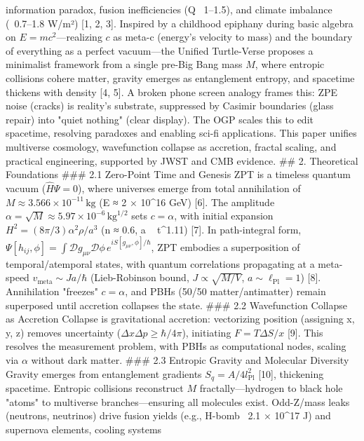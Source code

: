 information paradox, fusion inefficiencies (Q ~1–1.5), and climate imbalance (~0.7–1.8 W/m²) [1, 
2, 3]. Inspired by a childhood epiphany during basic algebra on \( E = mc^2 \)—realizing \( c \) 
as meta-c (energy’s velocity to mass) and the boundary of everything as a perfect vacuum—the 
Unified Turtle-Verse proposes a minimalist framework from a single pre-Big Bang mass \( M \), 
where entropic collisions cohere matter, gravity emerges as entanglement entropy, and 
spacetime thickens with density [4, 5]. A broken phone screen analogy frames this: ZPE noise 
(cracks) is reality’s substrate, suppressed by Casimir boundaries (glass repair) into "quiet 
nothing" (clear display). The OGP scales this to edit spacetime, resolving paradoxes and 
enabling sci-fi applications. This paper unifies multiverse cosmology, wavefunction collapse as 
accretion, fractal scaling, and practical engineering, supported by JWST and CMB evidence. 
## 2. Theoretical Foundations 
### 2.1 Zero-Point Time and Genesis 
ZPT is a timeless quantum vacuum (\( \hat{H} \Psi = 0 \)), where universes emerge from total 
annihilation of \( M \approx 3.566 \times 10^{-11} \, \text{kg} \) (E ≈ 2 × 10^{16} GeV) [6]. The 
amplitude \( \alpha = \sqrt{M} \approx 5.97 \times 10^{-6} \, \text{kg}^{1/2} \) sets \( c = \alpha \), 
with initial expansion \( H^2 = (8\pi/3) \alpha^2 \rho / a^3 \) (n ≈ 0.6, a ~ t^{1.11}) [7]. In 
path-integral form, \( \Psi [h_{ij}, \phi] = \int \mathcal{D} g_{\mu\nu} \mathcal{D} \phi \, e^{i 
S[g_{\mu\nu}, \phi]/\hbar} \), ZPT embodies a superposition of temporal/atemporal states, with 
quantum correlations propagating at a meta-speed \( v_{\text{meta}} \sim J a / \hbar \) 
(Lieb-Robinson bound, \( J \propto \sqrt{M / V} \), \( a \sim \ell_{\text{Pl}} = 1 \)) [8]. Annihilation 
"freezes" \( c = \alpha \), and PBHs (50/50 matter/antimatter) remain superposed until accretion 
collapses the state. 
### 2.2 Wavefunction Collapse as Accretion 
Collapse is gravitational accretion: vectorizing position (assigning x, y, z) removes uncertainty (\( 
\Delta x \Delta p \geq \hbar/4\pi \)), initiating \( F = T \Delta S / x \) [9]. This resolves the 
measurement problem, with PBHs as computational nodes, scaling via \( \alpha \) without dark 
matter. 
### 2.3 Entropic Gravity and Molecular Diversity 
Gravity emerges from entanglement gradients \( S_q = A / 4 l_{\text{Pl}}^2 \) [10], thickening 
spacetime. Entropic collisions reconstruct \( M \) fractally—hydrogen to black hole "atoms" to 
multiverse branches—ensuring all molecules exist. Odd-Z/mass leaks (neutrons, neutrinos) 
drive fusion yields (e.g., H-bomb ~2.1 × 10^{17} J) and supernova elements, cooling systems 
